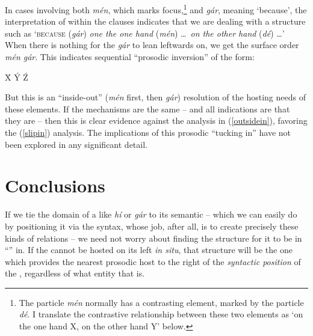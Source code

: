 \documentclass[output=paper,
modfonts
]{LSP/langsci}
\begin{document}
\noindent In cases involving both \textit{mén}, which marks focus,\footnote{The particle \textit{mén} normally has
a contrasting element, marked by the particle \textit{dé}. I translate the contrastive relationship between these two elements
as `on the one hand X, on the other hand Y' below.} and \textit{gár}, meaning `because', the interpretation of  within the clauses 
indicates that we are dealing with a structure such as `\textsc{because} (\textit{gár}) \textit{one the one hand} (\textit{mén}) \ldots\ \textit{on the other hand} (\textit{dé}) \ldots ' When there is nothing for the \textit{gár} to lean leftwards on, we get
the surface order \textit{mén gár}. This indicates sequential ``prosodic inversion'' of the form:

\vspace*{3ex}
\begin{exe}\ex
{\ob} {\textcolor{gray}{}} {\ob}{\textcolor{gray}{}} {\ob}\'{X}   \'{Y} \'{Z}{\cb}{\cb}{\cb}  
\end{exe}
\vspace*{1ex}


\noindent But this is an ``inside-out'' (\textit{mén} first, then \textit{gár}) resolution of the hosting needs of these elements. If the 
mechanisms are the same -- and all indications are that they are -- then this is clear evidence against the analysis in
(\ref{outsidein}), favoring the (\ref{slipin}) analysis. The implications of this prosodic ``tucking in'' have not been explored in any significant
detail.



\section{Conclusions}

If we tie the domain of a  like \textit{hí} or \textit{gár} to its semantic  -- which we can easily do by
positioning it via the syntax, whose job, after all, is to create precisely these kinds of  relations -- we
need not worry about finding the structure for it to be in ``'' in. If the  cannot be hosted
on its left \textit{in situ}, that structure will be the
one which provides the nearest prosodic host to the right of the \textit{syntactic position} of the ,
regardless of what entity that is. 
\end{document}
